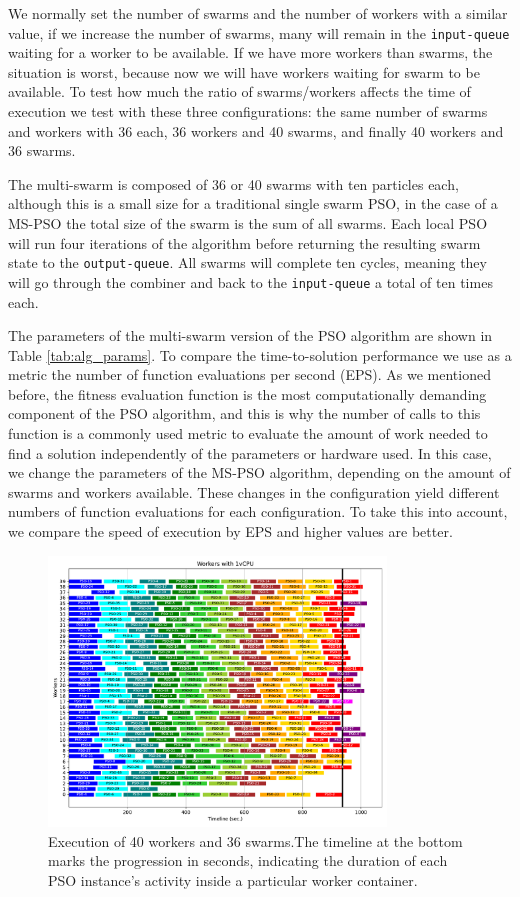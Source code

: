 \documentclass{cys}
\begin{document}
We normally set the number of swarms and the number of workers with a similar value,
if we increase the number of swarms, many will remain in the \texttt{input-queue} waiting 
for a worker to be available. If we have more workers than swarms, the situation is 
worst, because now we will have workers waiting for swarm to be available. 
To test how much the ratio of swarms/workers affects the time of execution we test 
with these three configurations: the same number of swarms and workers with
36 each, 36 workers and 40 swarms, and finally 40 workers and 36 swarms.
 
The multi-swarm is composed of 36 or 40 swarms with ten
particles each, although this is a small size for a traditional 
single swarm PSO, in the case of a MS-PSO the total size of the 
swarm is the sum of all swarms. Each local PSO will run four iterations of the algorithm
before returning the resulting swarm state to the \texttt{output-queue}. All swarms will
complete ten cycles, meaning they will go through the combiner and back to the
\texttt{input-queue} a total of ten times each. 

The parameters of the multi-swarm version of the PSO algorithm are shown in Table 
\ref{tab:alg_params}.
To compare the time-to-solution performance we use as a metric the number of 
function evaluations per second (EPS). As we mentioned before, the fitness 
evaluation function is the most computationally demanding component of the PSO 
algorithm, and this is why the number of calls to this function is a commonly 
used metric to evaluate the amount of work needed to 
find a solution independently of the parameters or hardware used. In this case, 
we change the parameters of the MS-PSO algorithm, depending on the amount 
of swarms and workers available. These changes in the configuration yield 
different numbers of function evaluations for each configuration. To take
this into account, we compare the speed of execution by EPS and higher 
values are better.

\begin{figure}[h]
\centering
\includegraphics[width=0.8\textwidth]{plotW40P36}
\caption{Execution of 40 workers and 36 swarms.The timeline at the bottom marks 
the progression in seconds, indicating the duration of each PSO instance's activity 
inside a particular worker container.}
\label{fig:40w36s}
\end{figure}
\end{document}
